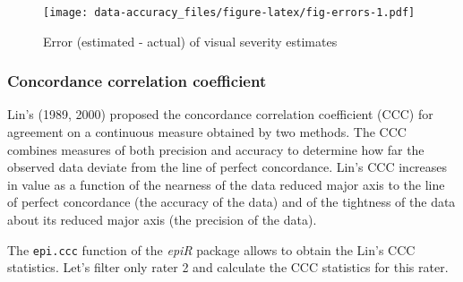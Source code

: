 \documentclass[
  letterpaper,
]{book}
\begin{document}
\begin{figure}

\texttt{[image: data-accuracy\_files/figure-latex/fig-errors-1.pdf]} \hfill{}

\caption{\label{fig-errors}Error (estimated - actual) of visual severity
estimates}

\end{figure}

\hypertarget{concordance-correlation-coefficient}{%
\subsubsection{Concordance correlation
coefficient}\label{concordance-correlation-coefficient}}

Lin's (1989, 2000) proposed the concordance correlation coefficient
(CCC) for agreement on a continuous measure obtained by two methods. The
CCC combines measures of both precision and accuracy to determine how
far the observed data deviate from the line of perfect concordance.
Lin's CCC increases in value as a function of the nearness of the data
reduced major axis to the line of perfect concordance (the accuracy of
the data) and of the tightness of the data about its reduced major axis
(the precision of the data).

The \texttt{epi.ccc} function of the \emph{epiR} package allows to
obtain the Lin's CCC statistics. Let's filter only rater 2 and calculate
the CCC statistics for this rater.
\end{document}

